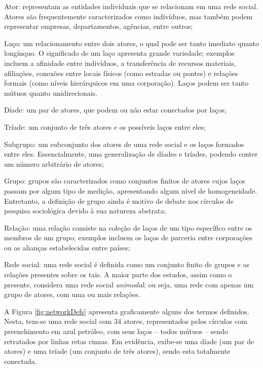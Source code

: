 \begin{alineas}
    \item Ator: representam as entidades individuais que se relacionam em uma rede social. Atores são frequentemente caracterizados como indivíduos, mas também podem representar empresas, departamentos, agências, entre outros;
    \item Laço: um relacionamento entre dois atores, o qual pode ser tanto imediato quanto longínquo. O significado de um laço apresenta grande variedade; exemplos incluem a afinidade entre indivíduos, a transferência de recursos materiais, afiliações, conexões entre locais físicos (como estradas ou pontes) e relações formais (como níveis hierárquicos em uma corporação). Laços podem ser tanto mútuos quanto unidirecionais.
    \item Díade: um par de atores, que podem ou não estar conectados por laços;
    \item Tríade: um conjunto de três atores e os possíveis laços entre eles;
    \item Subgrupo: um subconjunto dos atores de uma rede social e os laços formados entre eles. Essencialmente, uma generalização de díades e tríades, podendo conter um número arbitrário de atores;
    \item Grupo: grupos são caracterizados como conjuntos finitos de atores cujos laços passam por algum tipo de medição, apresentando algum nível de homogeneidade. Entretanto, a definição de grupo ainda é motivo de debate nos círculos de pesquisa sociológica devido à sua natureza abstrata;
    \item Relação: uma relação consiste na coleção de laços de um tipo específico entre os membros de um grupo; exemplos incluem os laços de parceria entre corporações ou as alianças estabelecidas entre países;
    \item Rede social: uma rede social é definida como um conjunto finito de grupos e as relações presentes sobre os tais. A maior parte dos estudos, assim como o presente, considera uma rede social \emph{unimodal}; ou seja, uma rede com apenas um grupo de atores, com uma ou mais relações.
\end{alineas}

A Figura \ref{fig:networkDefs} apresenta graficamente alguns dos termos definidos. Nesta, tem-se uma rede social com 34 atores, representados pelos círculos com preenchimento em azul petróleo, com seus laços -- todos mútuos -- sendo retratados por linhas retas cinzas. Em evidência, exibe-se uma díade (um par de atores) e uma tríade (um conjunto de três atores), sendo esta totalmente conectada.

